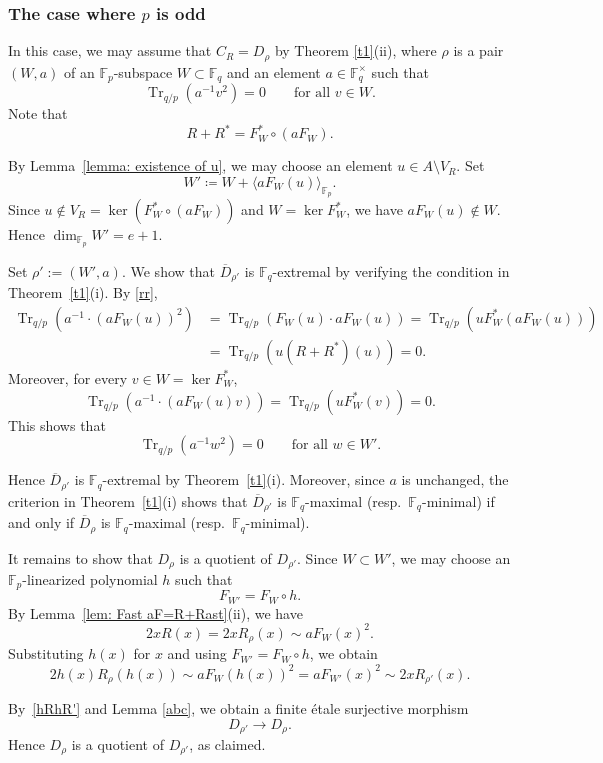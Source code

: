 \documentclass[12pt,a4paper]{amsart}
\theoremstyle{definition}
\def\F{{\mathbb F}}
\theoremstyle{remark}
\DeclareMathOperator{\Tr}{Tr}
\begin{document}
\subsubsection{The case where $p$ is odd}
In this case, we may assume that $C_R=D_{\rho}$ by Theorem \ref{t1}(ii), where $\rho$ is a pair $(W,a)$ of an $\F_p$-subspace $W\subset\F_q$ and an element 
$a\in \F_q^\times$  such that 
\[
\Tr_{q/p}(a^{-1}v^2)=0\qquad\text{for all $v\in W$.}
\]
Note that 
\begin{equation}\label{rr}
R+R^\ast=F_W^\ast \circ (aF_W).
\end{equation}

By Lemma~\ref{lemma: existence of u}, we may choose an element $u\in A\setminus V_R$. 
Set 
\[
W'\coloneqq W+\langle aF_W(u)\rangle_{\F_p}.
\]
Since $u\notin V_R=\ker (F_W^\ast \circ (a F_W))$ and $W=\ker F_W^\ast$, we have $a F_W(u) \not\in W$. 
Hence $\dim_{\F_p} W'=e+1$. 

Set $\rho':=(W',a)$. We show that $\overline{D}_{\rho'}$ is $\F_q$-extremal by verifying the condition in
Theorem~\ref{t1}(i). 
By \eqref{rr},  
\begin{align*}
\Tr_{q/p}(a^{-1} \cdot (aF_W(u))^2) &= \Tr_{q/p}(F_W(u) \cdot aF_W(u))
=\Tr_{q/p}(u  F_W^\ast(aF_W(u))) \\
&= \Tr_{q/p}(u(R+R^\ast)(u))=0. 
\end{align*}
Moreover, for every $v\in W=\ker F_W^\ast$, 
\[
\Tr_{q/p}(a^{-1} \cdot (aF_W(u)v))=\Tr_{q/p}(uF_W^\ast(v))=0. 
\]
This shows that
\[
\Tr_{q/p}(a^{-1}w^2)=0
\qquad\text{for all }w\in W'.
\]

Hence $\overline{D}_{\rho'}$ is $\F_q$-extremal by
Theorem~\ref{t1}(i). Moreover, since $a$ is unchanged, the criterion in
Theorem~\ref{t1}(i) shows that $\overline{D}_{\rho'}$ is $\F_q$-maximal
(resp.\ $\F_q$-minimal) if and only if $\overline{D}_{\rho}$ is
$\F_q$-maximal (resp.\ $\F_q$-minimal). 

\medskip

It remains to show that $D_{\rho}$ is a quotient of $D_{\rho'}$. Since $W\subset W'$, we may choose an $\F_p$-linearized polynomial 
$h$ such that
\[
F_{W'}=F_W\circ h.
\]
By Lemma~\ref{lem: Fast aF=R+Rast}(ii), we have 
\[
2xR(x)=2xR_\rho(x)\sim aF_W(x)^2. 
\]
Substituting $h(x)$ for $x$ and using $F_{W'}=F_W\circ h$, we obtain 
\begin{equation}\label{hRhR'}
    2h(x)R_\rho(h(x))\sim aF_W(h(x))^2=aF_{W'}(x)^2\sim 2x R_{\rho'}(x). 
\end{equation}


By~\eqref{hRhR'} and Lemma \ref{abc}, we obtain  a finite \'etale surjective morphism 
\[
D_{\rho'} \longrightarrow D_\rho. 
\]
Hence $D_\rho$ is a quotient of $D_{\rho'}$, as claimed. 
\end{document}
